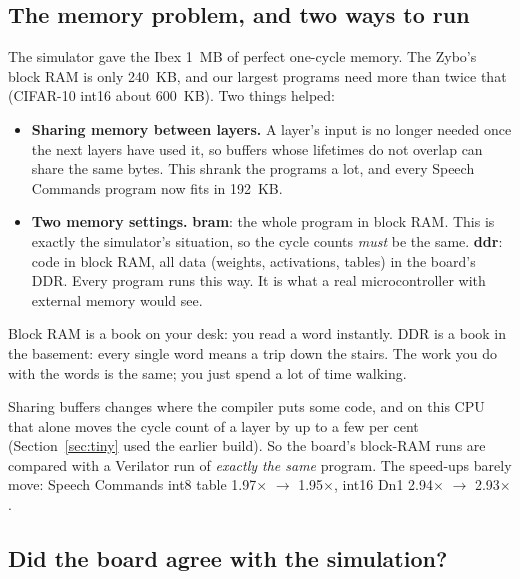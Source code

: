 \subsection{The memory problem, and two ways to run}

The simulator gave the Ibex 1~MB of perfect one-cycle memory. The Zybo's block RAM is only 240~KB, and our
largest programs need more than twice that (CIFAR-10 int16 about 600~KB). Two things helped:

\begin{itemize}
  \item \textbf{Sharing memory between layers.} A layer's input is no longer needed once the next layers have
        used it, so buffers whose lifetimes do not overlap can share the same bytes. This shrank the programs a
        lot, and every Speech Commands program now fits in 192~KB.
  \item \textbf{Two memory settings.}
        \textbf{bram}: the whole program in block RAM. This is exactly the simulator's situation, so the cycle
        counts \emph{must} be the same.
        \textbf{ddr}: code in block RAM, all data (weights, activations, tables) in the board's DDR. Every
        program runs this way. It is what a real microcontroller with external memory would see.
\end{itemize}

\begin{kid}
Block RAM is a book on your desk: you read a word instantly. DDR is a book in the basement: every single word
means a trip down the stairs. The work you do with the words is the same; you just spend a lot of time walking.
\end{kid}

\begin{careful}
Sharing buffers changes where the compiler puts some code, and on this CPU that alone moves the cycle count of
a layer by up to a few per cent (Section~\ref{sec:tiny} used the earlier build). So the board's block-RAM runs
are compared with a Verilator run of \emph{exactly the same} program. The speed-ups barely move: Speech
Commands int8 table 1.97$\times$ $\to$ 1.95$\times$, int16 Dn1 2.94$\times$ $\to$ 2.93$\times$.
\end{careful}

\subsection{Did the board agree with the simulation?}

